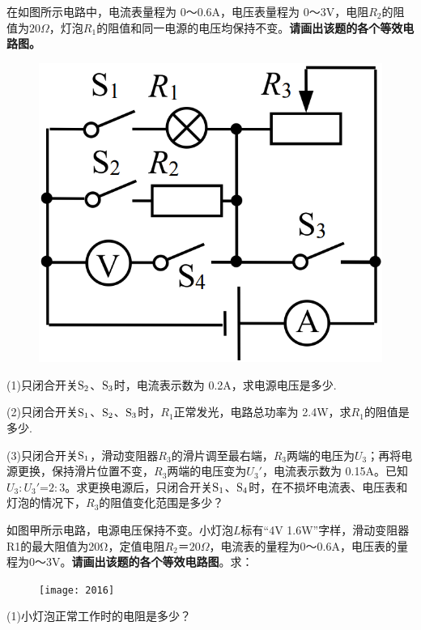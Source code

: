 \documentclass[11pt,a4paper]{article}
\newcommand{\nianfen}[1]{\hspace{-2em}{(#1\textbf{·}\textit{青岛})}}
\begin{document}
	
	\nianfen{2017}在如图所示电路中，电流表量程为 0～0.6A，电压表量程为 0～3V，电阻$R_2$的阻值为$20Ω$，灯泡$R_1$的阻值和同一电源的电压均保持不变。\textbf{请画出该题的各个等效电路图。}
	\begin{figure}
		\includegraphics[width=\linewidth]{2017.bmp}
	\end{figure}
	
	(1)只闭合开关$\rm S_2$、$\rm S_3$时，电流表示数为 0.2A，求电源电压是多少.
	
	(2)只闭合开关$\rm S_1$、$\rm S_2$、$\rm S_3$时，$R_1$正常发光，电路总功率为 2.4W，求$R_1$的阻值是多少.
	
	(3)只闭合开关$\rm S_1$，滑动变阻器$R_3$的滑片调至最右端，$R_3$两端的电压为$U_3$；再将电源更换，保持滑片位置不变，$R_3$两端的电压变为$U_3'$，电流表示数为 0.15A。已知$U_3:U_3'$=$2:3$。求更换电源后，只闭合开关$\rm S_1$、$\rm S_4$时，在不损坏电流表、电压表和灯泡的情况下，$R_3$的阻值变化范围是多少？
	\clearpage
	
	\nianfen{2016}如图甲所示电路，电源电压保持不变。小灯泡$ L $标有“4V 1.6W”字样，滑动变阻器R1的最大阻值为20Ω，定值电阻$ R_2＝20Ω $，电流表的量程为0～0.6A，电压表的量程为0～3V。\textbf{请画出该题的各个等效电路图}。求：
	
	\begin{figure}
		\texttt{[image: 2016]}
	\end{figure}
	
	(1)小灯泡正常工作时的电阻是多少？
	
\end{document}
